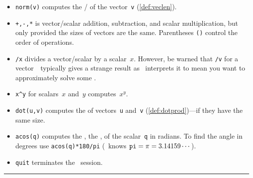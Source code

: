\begin{table}
\begin{minipage}{\linewidth}
\begin{itemize}
\item {}\verb|norm(v)| computes the \slash {} of the vector~\verb|v| (\cref{def:veclen}).

\item {}\verb|+,-,*| is vector\slash scalar addition, subtraction, and scalar multiplication, but only provided the sizes of vectors are the same.
Parentheses \verb|()| control the order of operations.

\item {}\verb|/x| divides a vector\slash scalar by a scalar~\(x\).
However, be warned that \verb|/v| for a vector~\vv\ typically gives a strange result as \script\ interprets it to mean you want to approximately solve some .

\item {}\verb|x^y| for scalars~\(x\) and~\(y\) computes~\(x^y\).

\item {}\verb|dot(u,v)| computes the  of vectors~\verb|u| and~\verb|v| (\cref{def:dotprod})---if they have the same size.

\item {}\verb|acos(q)| computes the , the , of the scalar~\verb|q| in radians.  
To find the angle in degrees use \verb|acos(q)*180/pi| (\script\ knows \(\verb|pi|=\pi=3.14159\cdots\)).

\item {}\verb|quit| terminates the \script\ session.
\end{itemize}
\end{minipage}
\hrule
\end{table}




